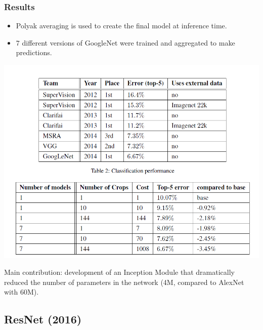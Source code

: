 \begin{frame}
	\frametitle{Results}

		\vspace{-0.4cm}

		\begin{itemize}
		\item Polyak averaging is used to create the final model at inference time.
		\item $7$ different versions of GoogleNet were trained and aggregated to make predictions.
	\end{itemize}


	\begin{center}
		\includegraphics[scale=0.7]{figs/GoogleNet_results}
	\end{center}



		{\small Main contribution: development of an Inception Module that dramatically reduced the number of parameters in the network (4M, compared to AlexNet with 60M). }

\end{frame}


\subsection{ResNet (2016)}

